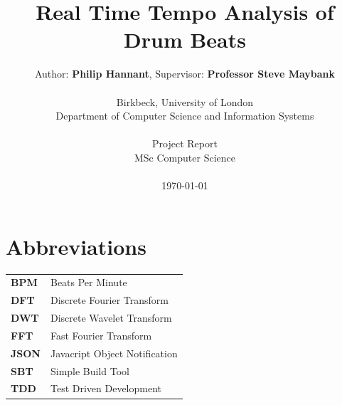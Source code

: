 \documentclass[a4paper, 11pt]{article}
\date{}
\begin{document}
 

\LARGE\title{Real Time Tempo Analysis of Drum Beats}

\LARGE\author{Author: \textbf{Philip Hannant}, Supervisor: \textbf{Professor Steve Maybank}\\
\\Birkbeck, University of London\\
Department of Computer Science and Information Systems\\
\\Project Report\\
MSc Computer Science\\
\\\monthyeardate\today
}





\normalsize


\maketitle
\newpage
\tableofcontents
\clearpage

\section*{Abbreviations}
\begin{tabular}{l p{4.5in}  }\\
\textbf{BPM} & Beats Per Minute\\
\textbf{DFT} & Discrete Fourier Transform\\
\textbf{DWT} & Discrete Wavelet Transform\\
\textbf{FFT} & Fast Fourier Transform\\
\textbf{JSON} & Javacript Object Notification\\
\textbf{SBT} & Simple Build Tool\\
\textbf{TDD} & Test Driven Development\\
\end{tabular}
\end{document}
